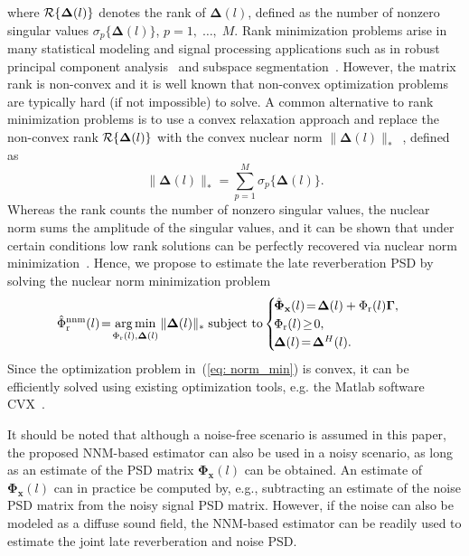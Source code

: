 \documentclass{article}
\DeclareMathOperator*{\argmin}{arg\,min}
\begin{document}
where ${\cal R}\{\mathbf{\Delta}(l)\}$ denotes the rank of $\mathbf{\Delta}(l)$, defined as the number of nonzero singular values $\sigma_p\{\mathbf{\Delta}(l)\}$, $p = 1, \; \ldots, \; M$.
Rank minimization problems arise in many statistical modeling and signal processing applications such as in robust principal component analysis~\cite{Candes_ACM_2011} and subspace segmentation~\cite{Liu_ITPAMI_2013}.
However, the matrix rank is non-convex and it is well known that non-convex optimization problems are typically hard (if not impossible) to solve.
A common alternative to rank minimization problems is to use a convex relaxation approach and replace the non-convex rank ${\cal{R}}\{ \mathbf{\Delta}(l) \}$ with the convex nuclear norm $\| \mathbf{\Delta}(l)\|_{*}$~\cite{Fazel_phd,Candes_ACM_2011, Liu_ITPAMI_2013}, defined as
\begin{equation}
\| \mathbf{\Delta}(l)\|_{*} = \sum_{p = 1}^M \sigma_p\{\mathbf{\Delta}(l)\}. 
\end{equation}
Whereas the rank counts the number of nonzero singular values, the nuclear norm sums the amplitude of the singular values, and it can be shown that under certain conditions low rank solutions can be perfectly recovered via nuclear norm minimization~\cite{Recht_SIAM_2010}.
Hence, we propose to estimate the late reverberation PSD by solving the nuclear norm minimization problem
\begin{equation}
  \label{eq: norm_min}
\hat{\Phi}^{\rm nnm}_{\rm r}(l) \!=\!  \argmin_{\Phi_{\rm r}(l), \mathbf{\Delta}(l)}  \|\mathbf{\Delta}(l)\|_{*}  \; \text{subject to}  \begin{cases}
    \!\hat{\boldsymbol{\Phi}}_{\mathbf{x}}(l) \!=\! \mathbf{\Delta}(l) + \Phi_{\rm r}(l)\boldsymbol{\Gamma},\\
    \!\Phi_{\rm r}(l) \!\geq\! 0,\\
    \!\mathbf{\Delta}(l) \!=\! \mathbf{\Delta}^H(l).
  \end{cases}
\end{equation}
Since the optimization problem in~(\ref{eq: norm_min}) is convex, it can be efficiently solved using existing optimization tools, e.g. the Matlab software CVX~\cite{cvx}.

It should be noted that although a noise-free scenario is assumed in this paper, the proposed NNM-based estimator can also be used in a noisy scenario, as long as an estimate of the PSD matrix $\boldsymbol{\Phi}_{\mathbf{x}}(l)$ can be obtained.
An estimate of $\boldsymbol{\Phi}_{\mathbf{x}}(l)$ can in practice be computed by, e.g., subtracting an estimate of the noise PSD matrix from the noisy signal PSD matrix.
However, if the noise can also be modeled as a diffuse sound field, the NNM-based estimator can be readily used to estimate the joint late reverberation and noise PSD.
\end{document}
